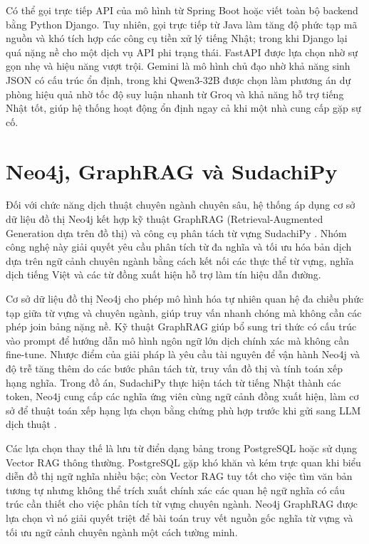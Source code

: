 \documentclass[../DoAn.tex]{subfiles}
\begin{document}
Có thể gọi trực tiếp API của mô hình từ Spring Boot hoặc viết toàn bộ backend bằng Python Django. Tuy nhiên, gọi trực tiếp từ Java làm tăng độ phức tạp mã nguồn và khó tích hợp các công cụ tiền xử lý tiếng Nhật; trong khi Django lại quá nặng nề cho một dịch vụ API phi trạng thái. FastAPI được lựa chọn nhờ sự gọn nhẹ và hiệu năng vượt trội. Gemini là mô hình chủ đạo nhờ khả năng sinh JSON có cấu trúc ổn định, trong khi Qwen3-32B được chọn làm phương án dự phòng hiệu quả nhờ tốc độ suy luận nhanh từ Groq và khả năng hỗ trợ tiếng Nhật tốt, giúp hệ thống hoạt động ổn định ngay cả khi một nhà cung cấp gặp sự cố.

\section{Neo4j, GraphRAG và SudachiPy}
\label{section:3.5}

Đối với chức năng dịch thuật chuyên ngành chuyên sâu, hệ thống áp dụng cơ sở dữ liệu đồ thị Neo4j kết hợp kỹ thuật GraphRAG (Retrieval-Augmented Generation dựa trên đồ thị) \cite{lewis2020rag} và công cụ phân tách từ vựng SudachiPy \cite{sudachipy-docs}. Nhóm công nghệ này giải quyết yêu cầu phân tích từ đa nghĩa và tối ưu hóa bản dịch dựa trên ngữ cảnh chuyên ngành bằng cách kết nối các thực thể từ vựng, nghĩa dịch tiếng Việt và các từ đồng xuất hiện hỗ trợ làm tín hiệu dẫn đường.

Cơ sở dữ liệu đồ thị Neo4j cho phép mô hình hóa tự nhiên quan hệ đa chiều phức tạp giữa từ vựng và chuyên ngành, giúp truy vấn nhanh chóng mà không cần các phép join bảng nặng nề. Kỹ thuật GraphRAG giúp bổ sung tri thức có cấu trúc vào prompt để hướng dẫn mô hình ngôn ngữ lớn dịch chính xác mà không cần fine-tune. Nhược điểm của giải pháp là yêu cầu tài nguyên để vận hành Neo4j và độ trễ tăng thêm do các bước phân tách từ, truy vấn đồ thị và tính toán xếp hạng nghĩa. Trong đồ án, SudachiPy thực hiện tách từ tiếng Nhật thành các token, Neo4j cung cấp các nghĩa ứng viên cùng ngữ cảnh đồng xuất hiện, làm cơ sở để thuật toán xếp hạng lựa chọn bằng chứng phù hợp trước khi gửi sang LLM dịch thuật \cite{neo4j-cypher-manual}.

Các lựa chọn thay thế là lưu từ điển dạng bảng trong PostgreSQL hoặc sử dụng Vector RAG thông thường. PostgreSQL gặp khó khăn và kém trực quan khi biểu diễn đồ thị ngữ nghĩa nhiều bậc; còn Vector RAG tuy tốt cho việc tìm văn bản tương tự nhưng không thể trích xuất chính xác các quan hệ ngữ nghĩa có cấu trúc cần thiết cho việc phân tích từ vựng chuyên ngành. Neo4j GraphRAG được lựa chọn vì nó giải quyết triệt để bài toán truy vết nguồn gốc nghĩa từ vựng và tối ưu ngữ cảnh chuyên ngành một cách tường minh.
\end{document}
